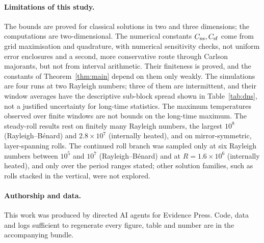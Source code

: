 \paragraph{Limitations of this study.} The bounds are proved for classical solutions in two and three dimensions;
the computations are two-dimensional. The numerical constants $C_{\rm ns},C_{\rm sf}$ come from grid maximisation
and quadrature, with numerical sensitivity checks, not uniform error enclosures and a second, more conservative route through Carlson majorants, but not from
interval arithmetic. Their finiteness is proved, and the constants of Theorem~\ref{thm:main} depend on them only
weakly. The simulations are four runs at two Rayleigh numbers; three of them are intermittent, and their window
averages have the descriptive sub-block spread shown in Table~\ref{tab:dns}, not a justified uncertainty for long-time statistics. The maximum temperatures observed over finite
windows are not bounds on the long-time maximum. The
steady-roll results rest on finitely many Rayleigh numbers, the largest $10^8$ (Rayleigh--B\'enard) and
$2.8\times10^7$ (internally heated), and on mirror-symmetric, layer-spanning rolls. The continued roll branch was
sampled only at six Rayleigh numbers between $10^5$ and $10^7$ (Rayleigh--B\'enard) and at $R=1.6\times10^6$
(internally heated), and only over the period ranges stated; other solution families, such as rolls stacked in
the vertical, were not explored.

\paragraph{Authorship and data.} This work was produced by directed AI agents for Evidence Press. Code, data and
logs sufficient to regenerate every figure, table and number are in the accompanying bundle.
